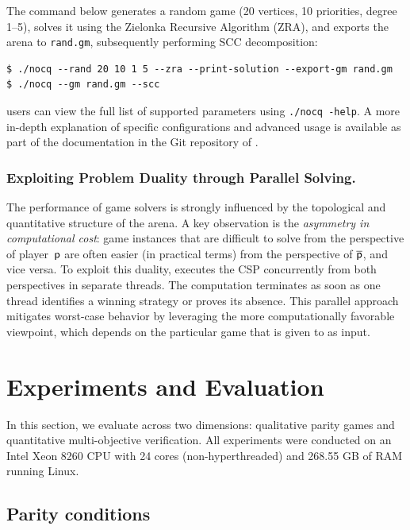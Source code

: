 \documentclass[a4paper,UKenglish,cleveref, autoref, thm-restate]{lipics-v2021}
\begin{document}
The command below generates a random game (20 vertices, 10 priorities, degree 1–5), solves it using the Zielonka Recursive Algorithm (ZRA), and exports the arena to \texttt{rand.gm}, subsequently performing SCC decomposition:

\begin{lstlisting}
$ ./nocq --rand 20 10 1 5 --zra --print-solution --export-gm rand.gm
$ ./nocq --gm rand.gm --scc
\end{lstlisting}

\noindent \nocq users can view the full list of supported parameters using \texttt{./nocq -\-help}. A more in-depth explanation of specific configurations and advanced usage is available as part of the documentation in the Git repository of \nocq. 

\subsubsection{Exploiting Problem Duality through Parallel Solving.}

The performance of game solvers is strongly influenced by the topological and quantitative structure of the arena. A key observation is the \emph{asymmetry in computational cost}: game instances that are difficult to solve from the perspective of player~$\mathsf{p}$ are often easier (in practical terms) from the perspective of $\overline{\mathsf{p}}$, and vice versa.
%
To exploit this duality, \nocq executes the CSP concurrently from both perspectives in separate threads. The computation terminates as soon as one thread identifies a winning strategy or proves its absence. This parallel approach mitigates worst-case behavior by leveraging the more computationally favorable viewpoint, which depends on the particular game that is given to \nocq as input. 


\section{Experiments and Evaluation}\label{sec:experiments}

In this section, we evaluate \nocq across two dimensions: qualitative parity games and quantitative multi-objective verification. All experiments were conducted on an Intel Xeon 8260 CPU with 24 cores (non-hyperthreaded) and 268.55 GB of RAM running Linux.


\subsection{Parity conditions}
\end{document}
